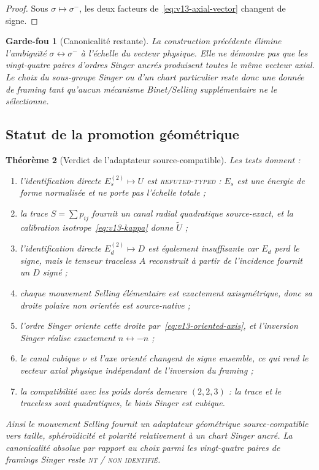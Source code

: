 \documentclass[11pt,a4paper]{article}
\newtheorem{theorem}{Théorème}[section]
\newtheorem{guardrail}[theorem]{Garde-fou}
\newcommand{\statusNT}{\textsc{nt / non identifié}}
\begin{document}
\begin{proof}
Sous $\sigma\mapsto\sigma^-$, les deux facteurs de~\eqref{eq:v13-axial-vector} changent de signe.
\end{proof}

\begin{guardrail}[Canonicalité restante]
La construction précédente élimine l'ambiguïté $\sigma\leftrightarrow\sigma^-$ à l'échelle du vecteur physique. Elle ne démontre pas que les vingt-quatre paires d'ordres Singer ancrés produisent toutes le même vecteur axial. Le choix du sous-groupe Singer ou d'un chart particulier reste donc une donnée de framing tant qu'aucun mécanisme Binet/Selling supplémentaire ne le sélectionne.
\end{guardrail}

\subsection{Statut de la promotion géométrique}

\begin{theorem}[Verdict de l'adaptateur source-compatible]\label{thm:v13-promotion}
Les tests donnent :
\begin{enumerate}[label=\textup{(\roman*)}]
\item l'identification directe $E_s^{(2)}\mapsto U$ est \textsc{refuted-typed} : $E_s$ est une énergie de forme normalisée et ne porte pas l'échelle totale ;
\item la trace $S=\sum p_{ij}$ fournit un canal radial quadratique source-exact, et la calibration isotrope~\eqref{eq:v13-kappa} donne $\widetilde U$ ;
\item l'identification directe $E_d^{(2)}\mapsto D$ est également insuffisante car $E_d$ perd le signe, mais le tenseur traceless $A$ reconstruit à partir de l'incidence fournit un $D$ signé ;
\item chaque mouvement Selling élémentaire est exactement axisymétrique, donc sa droite polaire non orientée est source-native ;
\item l'ordre Singer oriente cette droite par~\eqref{eq:v13-oriented-axis}, et l'inversion Singer réalise exactement $n\leftrightarrow-n$ ;
\item le canal cubique $\nu$ et l'axe orienté changent de signe ensemble, ce qui rend le vecteur axial physique indépendant de l'inversion du framing ;
\item la compatibilité avec les poids dorés demeure $(2,2,3)$ : la trace et le traceless sont quadratiques, le biais Singer est cubique.
\end{enumerate}
Ainsi le mouvement Selling fournit un adaptateur géométrique source-compatible vers taille, sphéroïdicité et polarité \emph{relativement à un chart Singer ancré}. La canonicalité absolue par rapport au choix parmi les vingt-quatre paires de framings Singer reste \statusNT{}.
\end{theorem}
\end{document}

